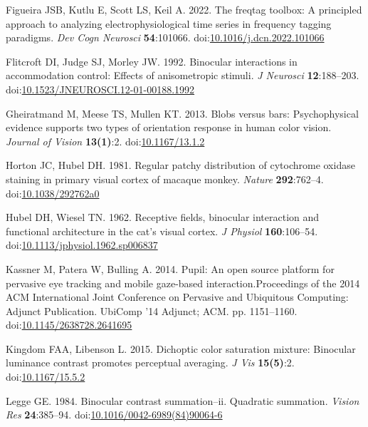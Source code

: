 \documentclass[
]{article}
\begin{document}
\leavevmode\hypertarget{ref-Figueira2022}{}%
Figueira JSB, Kutlu E, Scott LS, Keil A. 2022. The freqtag toolbox: A principled approach to analyzing electrophysiological time series in frequency tagging paradigms. \emph{Dev Cogn Neurosci} \textbf{54}:101066. doi:\href{https://doi.org/10.1016/j.dcn.2022.101066}{10.1016/j.dcn.2022.101066}

\leavevmode\hypertarget{ref-Flitcroft1992}{}%
Flitcroft DI, Judge SJ, Morley JW. 1992. Binocular interactions in accommodation control: Effects of anisometropic stimuli. \emph{J Neurosci} \textbf{12}:188--203. doi:\href{https://doi.org/10.1523/JNEUROSCI.12-01-00188.1992}{10.1523/JNEUROSCI.12-01-00188.1992}

\leavevmode\hypertarget{ref-Gheiratmand2013}{}%
Gheiratmand M, Meese TS, Mullen KT. 2013. Blobs versus bars: Psychophysical evidence supports two types of orientation response in human color vision. \emph{Journal of Vision} \textbf{13(1)}:2. doi:\href{https://doi.org/10.1167/13.1.2}{10.1167/13.1.2}

\leavevmode\hypertarget{ref-Horton1981}{}%
Horton JC, Hubel DH. 1981. Regular patchy distribution of cytochrome oxidase staining in primary visual cortex of macaque monkey. \emph{Nature} \textbf{292}:762--4. doi:\href{https://doi.org/10.1038/292762a0}{10.1038/292762a0}

\leavevmode\hypertarget{ref-Hubel1962}{}%
Hubel DH, Wiesel TN. 1962. Receptive fields, binocular interaction and functional architecture in the cat's visual cortex. \emph{J Physiol} \textbf{160}:106--54. doi:\href{https://doi.org/10.1113/jphysiol.1962.sp006837}{10.1113/jphysiol.1962.sp006837}

\leavevmode\hypertarget{ref-Kassner2014}{}%
Kassner M, Patera W, Bulling A. 2014. Pupil: An open source platform for pervasive eye tracking and mobile gaze-based interaction.Proceedings of the 2014 ACM International Joint Conference on Pervasive and Ubiquitous Computing: Adjunct Publication. UbiComp '14 Adjunct; ACM. pp. 1151--1160. doi:\href{https://doi.org/10.1145/2638728.2641695}{10.1145/2638728.2641695}

\leavevmode\hypertarget{ref-Kingdom2015}{}%
Kingdom FAA, Libenson L. 2015. Dichoptic color saturation mixture: Binocular luminance contrast promotes perceptual averaging. \emph{J Vis} \textbf{15(5)}:2. doi:\href{https://doi.org/10.1167/15.5.2}{10.1167/15.5.2}

\leavevmode\hypertarget{ref-Legge1984}{}%
Legge GE. 1984. Binocular contrast summation--ii. Quadratic summation. \emph{Vision Res} \textbf{24}:385--94. doi:\href{https://doi.org/10.1016/0042-6989(84)90064-6}{10.1016/0042-6989(84)90064-6}
\end{document}
